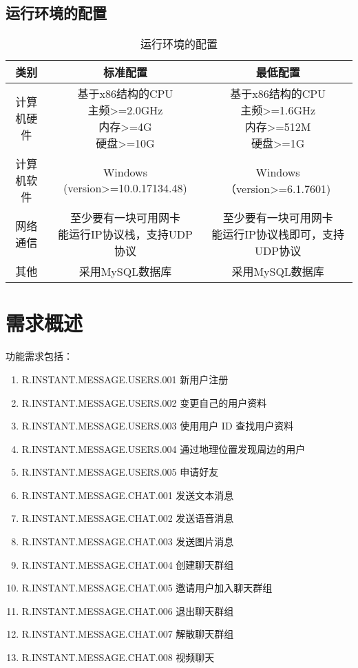 \subsection{运行环境的配置}
\begin{table}[htbp]
\centering
\caption{运行环境的配置} \label{tab:operation-environment}
\begin{tabular}{|c|c|c|}
    \hline
    类别 & 标准配置 & 最低配置 \\
    \hline
    计算机硬件 & \tabincell{c}{基于x86结构的CPU\\ 主频>=2.0GHz\\ 内存>=4G\\ 硬盘>=10G} & \tabincell{c}{基于x86结构的CPU\\ 主频>=1.6GHz\\ 内存>=512M\\ 硬盘>=1G} \\
    \hline
    计算机软件 & \tabincell{c}{Windows (version>=10.0.17134.48)\\ } & \tabincell{c}{Windows（version>=6.1.7601)\\    } \\
    \hline
    网络通信 & \tabincell{c}{至少要有一块可用网卡\\ 能运行IP协议栈，支持UDP协议} & \tabincell{c}{至少要有一块可用网卡\\ 能运行IP协议栈即可，支持UDP协议} \\
    \hline
    其他 & 采用MySQL数据库 & 采用MySQL数据库 \\
    \hline

\end{tabular}
\end{table}

\section{需求概述}
功能需求包括：
\begin{enumerate}
\item R.INSTANT.MESSAGE.USERS.001 新用户注册
\item R.INSTANT.MESSAGE.USERS.002 变更自己的用户资料
\item R.INSTANT.MESSAGE.USERS.003 使用用户 ID 查找用户资料
\item R.INSTANT.MESSAGE.USERS.004 通过地理位置发现周边的用户
\item R.INSTANT.MESSAGE.USERS.005 申请好友
\item R.INSTANT.MESSAGE.CHAT.001 发送文本消息
\item R.INSTANT.MESSAGE.CHAT.002 发送语音消息
\item R.INSTANT.MESSAGE.CHAT.003 发送图片消息
\item R.INSTANT.MESSAGE.CHAT.004 创建聊天群组
\item R.INSTANT.MESSAGE.CHAT.005 邀请用户加入聊天群组
\item R.INSTANT.MESSAGE.CHAT.006 退出聊天群组
\item R.INSTANT.MESSAGE.CHAT.007 解散聊天群组
\item R.INSTANT.MESSAGE.CHAT.008 视频聊天
\end{enumerate}


